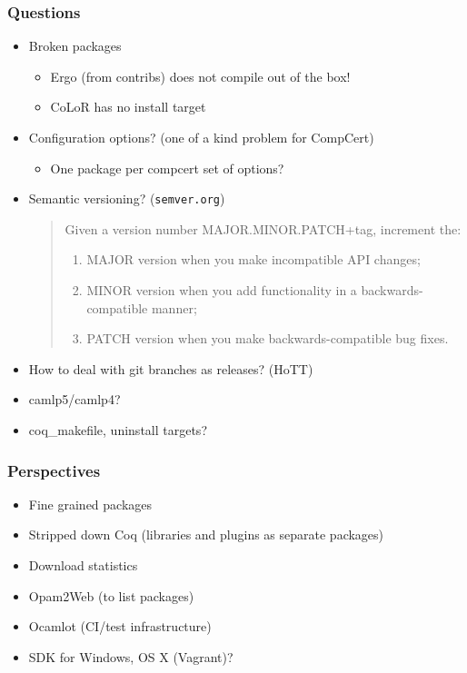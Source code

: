 \documentclass[9pt]{beamer}
\begin{document}
\begin{frame}
  \frametitle{Questions}
  
  \begin{itemize}
  \item \alert{Broken} packages
    \begin{itemize}
    \item Ergo (from contribs) does not compile out of the box!
    \item CoLoR has no install target
    \end{itemize}
    \pause
  \item Configuration options? (one of a kind problem for CompCert)
    \begin{itemize}
    \item One package per compcert set of options?
    \end{itemize}
    \pause
  \item Semantic versioning? ({\tt semver.org}) \\
    \begin{quote}
      Given a version number MAJOR.MINOR.PATCH+tag, increment the:
      \begin{enumerate}
      \item MAJOR version when you make incompatible API changes;
      \item MINOR version when you add functionality in a
        backwards-compatible manner;
      \item PATCH version when you make backwards-compatible bug
        fixes.
      \end{enumerate}
    \end{quote}
    \pause
  \item How to deal with git branches as releases? (HoTT)
  \item camlp5/camlp4?
  \item coq\_makefile, uninstall targets?
  \end{itemize}
\end{frame}

\begin{frame}
  \frametitle {Perspectives}

  \begin{itemize}
  \item Fine grained packages
  \item Stripped down Coq (libraries and plugins as separate packages)
  \item Download statistics
  \item Opam2Web (to list packages)
  \item Ocamlot (CI/test infrastructure)
  \item SDK for Windows, OS X (Vagrant)?
  \end{itemize}
\end{frame}
\end{document}

